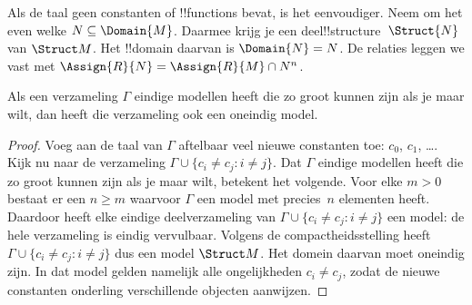 \documentclass[openany]{memoir}
\begin{document}
\begin{rem}
Als de taal geen constanten of !!{function}s bevat, is het eenvoudiger.
Neem om het even welke $N \subseteq \Domain{M}$.  Daarmee krijg je een
deel!!{structure}~$\Struct{N}$ van $\Struct M$.  Het !!{domain} daarvan
is $\Domain{N} = N$.  De relaties leggen we vast met $\Assign{R}{N} =
\Assign{R}{M} \cap N^n$.
\end{rem}

\endgroup

\begingroup
\def\olfilename{OLP-0186}
\def\olfilepath{content/model-theory/basics/}
\hypertarget{unit-OLP-0186}{}




\begin{thm}
 Als een verzameling $\Gamma$ eindige modellen heeft
die zo groot kunnen zijn als je maar wilt, dan heeft die verzameling ook
een oneindig model.
\end{thm}

\begin{proof}
Voeg aan de taal van $\Gamma$ aftelbaar veel nieuwe constanten toe:
$c_0$, $c_1$, \dots. Kijk nu naar de verzameling $\Gamma \cup \{c_i \neq c_j :
i \neq j\}$. Dat $\Gamma$ eindige modellen heeft die zo groot kunnen
zijn als je maar wilt, betekent het volgende. Voor elke $m >0$ bestaat er
een $n\ge m$ waarvoor $\Gamma$ een model met precies~$n$ elementen heeft.
Daardoor heeft elke eindige deelverzameling van $\Gamma \cup \{c_i \neq
c_j : i \neq j\}$ een model: de hele verzameling is eindig vervulbaar.
Volgens de compactheidsstelling heeft $\Gamma \cup \{c_i \neq c_j : i
\neq j\}$ dus een model $\Struct M$. Het domein daarvan moet oneindig
zijn. In dat model gelden namelijk alle ongelijkheden $c_i \neq c_j$,
zodat de nieuwe constanten onderling verschillende objecten aanwijzen.
\end{proof}
\end{document}
